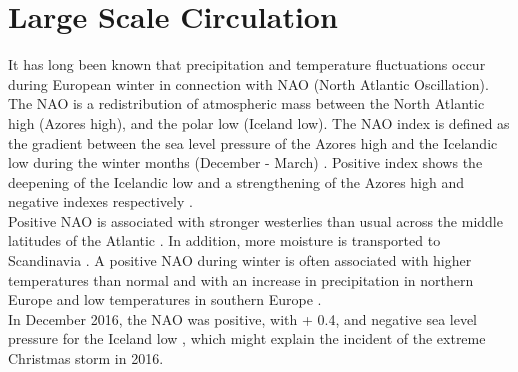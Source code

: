 \section{Large Scale Circulation} \label{sec:largeScale}
It has long been known that precipitation and temperature fluctuations occur during European winter in connection with NAO (North Atlantic Oscillation). The NAO is a redistribution of atmospheric mass between the North Atlantic high (Azores high), and the polar low (Iceland low).
The NAO index is defined as the gradient between the sea level pressure of the Azores high and the Icelandic low during the winter months (December - March) \citep{hurrell_decadal_1995}. Positive index shows the deepening of the Icelandic low and a strengthening of the Azores high and negative indexes respectively \citep{uvo_analysis_2003}. 
\\
Positive NAO is associated with stronger westerlies than usual across the middle latitudes of the Atlantic \citep{uvo_analysis_2003}. In addition, more moisture is transported to Scandinavia \citep{hurrell_decadal_1995}. A positive NAO during winter is often associated with higher temperatures than normal and with an increase in precipitation in northern Europe and low temperatures in southern Europe \citep{uvo_analysis_2003}.
\\
In December 2016, the NAO was positive, with + \num{0.4}, and negative sea level pressure for the Iceland low \citep{shi_climate_2016}, which might explain the incident of the extreme Christmas storm in 2016.

